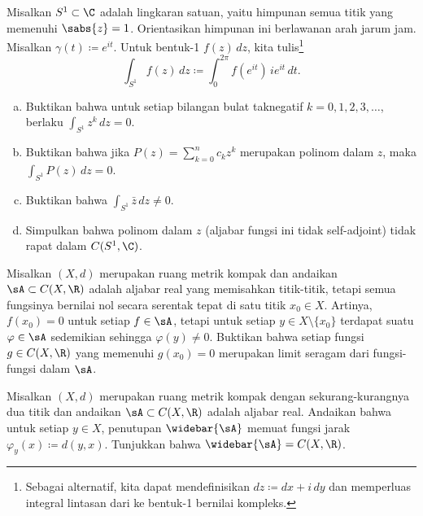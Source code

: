 \begin{exercise} \label{exercise:selfadjointSW}
Misalkan $S^1 \subset \C$ adalah lingkaran satuan, yaitu himpunan semua
titik yang memenuhi $\sabs{z} = 1$.  Orientasikan himpunan ini berlawanan arah jarum jam.
Misalkan $\gamma(t) \coloneqq e^{it}$.
Untuk bentuk-1 $f(z)\,dz$, kita tulis\footnote{%
Sebagai alternatif, kita dapat mendefinisikan $dz \coloneqq dx + i \, dy$ dan
memperluas integral lintasan dari  ke
bentuk-1 bernilai kompleks.}
\begin{equation*}
\int_{S^1} f(z) \,dz \coloneqq \int_0^{2\pi} f(e^{it}) \, i e^{it} \, dt . 
\end{equation*}
\begin{enumerate}[a)]
\item
Buktikan bahwa untuk setiap bilangan bulat taknegatif $k = 0,1,2,3,\ldots$, berlaku
$\int_{S^1} z^k \, dz = 0$.
\item
Buktikan bahwa jika
$P(z) = \sum_{k=0}^n c_k z^k$ merupakan
polinom dalam $z$, maka
$\int_{S^1} P(z) \, dz = 0$.
\item
Buktikan bahwa
$\int_{S^1} \bar{z} \, dz \neq 0$.
\item
Simpulkan bahwa polinom dalam $z$ (aljabar fungsi ini
tidak self-adjoint) tidak rapat dalam $C(S^1,\C)$.
\end{enumerate}
\end{exercise}

\begin{exercise}
Misalkan $(X,d)$ merupakan ruang metrik kompak dan
andaikan $\sA \subset C(X,\R)$ adalah aljabar real yang memisahkan titik-titik, tetapi
semua fungsinya bernilai nol secara serentak tepat di satu titik $x_0 \in X$.
Artinya, $f(x_0) = 0$ untuk setiap $f \in \sA$,
tetapi untuk setiap $y \in X \setminus \{ x_0 \}$ terdapat
suatu $\varphi \in \sA$ sedemikian sehingga $\varphi(y) \neq 0$.  Buktikan bahwa
setiap fungsi $g \in C(X,\R)$ yang memenuhi $g(x_0) = 0$ merupakan limit seragam
dari fungsi-fungsi dalam $\sA$.
\end{exercise}

\begin{exercise}
Misalkan $(X,d)$ merupakan ruang metrik kompak dengan sekurang-kurangnya dua titik dan
andaikan $\sA \subset C(X,\R)$ adalah aljabar real.
Andaikan bahwa untuk setiap $y \in X$, penutupan $\widebar{\sA}$
memuat fungsi jarak $\varphi_y(x) \coloneqq d(y,x)$.
Tunjukkan bahwa $\widebar{\sA} = C(X,\R)$.
\end{exercise}

